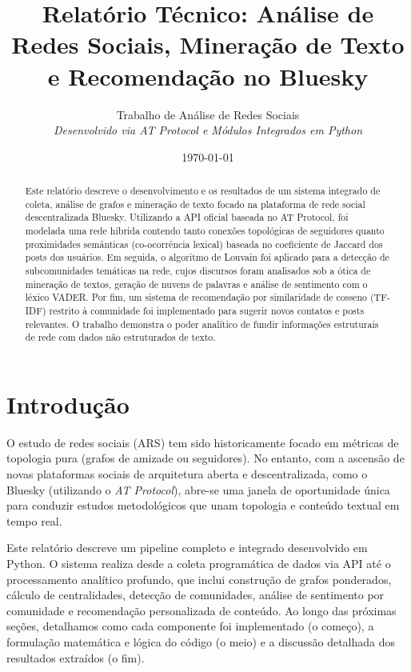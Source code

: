 \documentclass[12pt,a4paper]{article}
\title{\textbf{Relatório Técnico: Análise de Redes Sociais, Mineração de Texto e Recomendação no Bluesky}}
\author{Trabalho de Análise de Redes Sociais\\
\textit{Desenvolvido via AT Protocol e Módulos Integrados em Python}}
\date{\today}
\begin{document}
\maketitle

\begin{abstract}
Este relatório descreve o desenvolvimento e os resultados de um sistema integrado de coleta, análise de grafos e mineração de texto focado na plataforma de rede social descentralizada Bluesky. Utilizando a API oficial baseada no AT Protocol, foi modelada uma rede híbrida contendo tanto conexões topológicas de seguidores quanto proximidades semânticas (co-ocorrência lexical) baseada no coeficiente de Jaccard dos posts dos usuários. Em seguida, o algoritmo de Louvain foi aplicado para a detecção de subcomunidades temáticas na rede, cujos discursos foram analisados sob a ótica de mineração de textos, geração de nuvens de palavras e análise de sentimento com o léxico VADER. Por fim, um sistema de recomendação por similaridade de cosseno (TF-IDF) restrito à comunidade foi implementado para sugerir novos contatos e posts relevantes. O trabalho demonstra o poder analítico de fundir informações estruturais de rede com dados não estruturados de texto.
\end{abstract}

\newpage

\section{Introdução}
O estudo de redes sociais (ARS) tem sido historicamente focado em métricas de topologia pura (grafos de amizade ou seguidores). No entanto, com a ascensão de novas plataformas sociais de arquitetura aberta e descentralizada, como o Bluesky (utilizando o \textit{AT Protocol}), abre-se uma janela de oportunidade única para conduzir estudos metodológicos que unam topologia e conteúdo textual em tempo real.

Este relatório descreve um pipeline completo e integrado desenvolvido em Python. O sistema realiza desde a coleta programática de dados via API até o processamento analítico profundo, que inclui construção de grafos ponderados, cálculo de centralidades, detecção de comunidades, análise de sentimento por comunidade e recomendação personalizada de conteúdo. Ao longo das próximas seções, detalhamos como cada componente foi implementado (o começo), a formulação matemática e lógica do código (o meio) e a discussão detalhada dos resultados extraídos (o fim).
\end{document}
